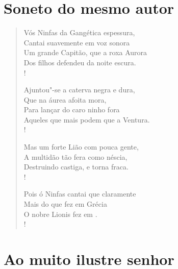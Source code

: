 \chapter*{Soneto do mesmo autor} 

%

\begin{verse}
Vós Ninfas da Gangética espessura,\\  
Cantai suavemente em voz sonora\\
Um grande Capitão, que a roxa Aurora\\
Dos filhos defendeu da noite escura.\\!

Ajuntou"-se a caterva negra e dura,\\
Que na áurea  afoita mora,\\
Para lançar do caro ninho fora\\
Aqueles que mais podem que a Ventura.\\!

Mas um forte Lião com pouca gente,\\
A multidão tão fera como néscia,\\
Destruindo castiga, e torna fraca.\\!

Pois ó Ninfas cantai que claramente\\
Mais do que fez  em Grécia\\  
O nobre Lionis fez em .\\!
\end{verse}

\chapter*{Ao muito ilustre senhor}

%
%

